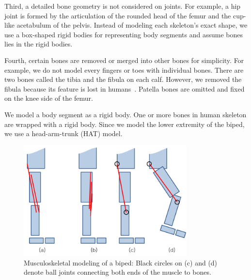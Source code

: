 \documentclass[master,english,final]{kaist-ucs}
\begin{document}
Third, a detailed bone geometry is not considered on joints.
For example, a hip joint is formed by the articulation of the rounded head of the femur and
the cup-like acetabulum of the pelvis. Instead of modeling each skeleton's exact shape,
we use a box-shaped rigid bodies for representing body segments and assume bones lies
in the rigid bodies.

Fourth, certain bones are removed or merged into other bones for simplicity.
For example, we do not model every fingers or toes with individual bones.
There are two bones called the tibia and the fibula on each calf.
However, we removed the fibula because its feature is lost in humans~\cite{nofibula}.
Patella bones are omitted and fixed on the knee side of the femur.

We model a body segment as a rigid body. One or more bones in human skeleton are
wrapped with a rigid body. Since we model the lower extremity of the biped,
we use a head-arm-trunk (HAT) model.


\begin{figure}[h!]
  \centering
  \includegraphics[width=3.5in]{muscleabs}
  \caption[Musculoskeletal modeling of a biped]{Musculoskeletal modeling of a biped:
  Black circles on (c) and (d) denote ball joints connecting both ends of the muscle to bones.}
  \label{muscleabs}
\end{figure}



\end{document}
